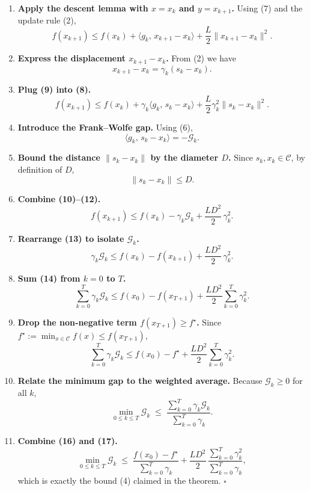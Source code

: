 \documentclass{article}
\begin{document}
\begin{enumerate}[label=[Step \arabic*]]
\item \textbf{Apply the descent lemma with $x=x_k$ and $y=x_{k+1}$.}  
Using (7) and the update rule (2),
\[
f(x_{k+1})
\le f(x_k)+\langle g_k,\,x_{k+1}-x_k\rangle
     +\frac{L}{2}\|x_{k+1}-x_k\|^{2}.
\tag{8}
\]

\item \textbf{Express the displacement $x_{k+1}-x_k$.}  
From (2) we have
\[
x_{k+1}-x_k = \gamma_k (s_k-x_k).
\tag{9}
\]

\item \textbf{Plug (9) into (8).}  
\[
f(x_{k+1})
\le f(x_k)+\gamma_k\langle g_k,\,s_k-x_k\rangle
     +\frac{L}{2}\gamma_k^{2}\|s_k-x_k\|^{2}.
\tag{10}
\]

\item \textbf{Introduce the Frank–Wolfe gap.}  
Using (6),
\[
\langle g_k,\,s_k-x_k\rangle = -\mathcal G_k .
\tag{11}
\]

\item \textbf{Bound the distance $\|s_k-x_k\|$ by the diameter $D$.}  
Since $s_k,x_k\in\mathcal C$, by definition of $D$,
\[
\|s_k-x_k\|\le D .
\tag{12}
\]

\item \textbf{Combine (10)–(12).}  
\[
f(x_{k+1})
\le f(x_k)-\gamma_k\mathcal G_k
     +\frac{L D^{2}}{2}\,\gamma_k^{2}.
\tag{13}
\]

\item \textbf{Rearrange (13) to isolate $\mathcal G_k$.}  
\[
\gamma_k\mathcal G_k
\le f(x_k)-f(x_{k+1})+\frac{L D^{2}}{2}\,\gamma_k^{2}.
\tag{14}
\]

\item \textbf{Sum (14) from $k=0$ to $T$.}  
\[
\sum_{k=0}^{T}\gamma_k\mathcal G_k
\le f(x_0)-f(x_{T+1})
   +\frac{L D^{2}}{2}\sum_{k=0}^{T}\gamma_k^{2}.
\tag{15}
\]

\item \textbf{Drop the non‑negative term $f(x_{T+1})\ge f^\star$.}  
Since $f^\star:=\min_{x\in\mathcal C}f(x)\le f(x_{T+1})$,
\[
\sum_{k=0}^{T}\gamma_k\mathcal G_k
\le f(x_0)-f^\star
   +\frac{L D^{2}}{2}\sum_{k=0}^{T}\gamma_k^{2}.
\tag{16}
\]

\item \textbf{Relate the minimum gap to the weighted average.}  
Because $\mathcal G_k\ge 0$ for all $k$,
\[
\min_{0\le k\le T}\mathcal G_k
\;\le\;
\frac{\sum_{k=0}^{T}\gamma_k\mathcal G_k}{\sum_{k=0}^{T}\gamma_k}.
\tag{17}
\]

\item \textbf{Combine (16) and (17).}  
\[
\min_{0\le k\le T}\mathcal G_k
\;\le\;
\frac{f(x_0)-f^\star}{\sum_{k=0}^{T}\gamma_k}
   +\frac{L D^{2}}{2}\,
      \frac{\sum_{k=0}^{T}\gamma_k^{2}}{\sum_{k=0}^{T}\gamma_k},
\tag{18}
\]
which is exactly the bound (4) claimed in the theorem. \hfill $\square$
\end{enumerate}
\end{document}
